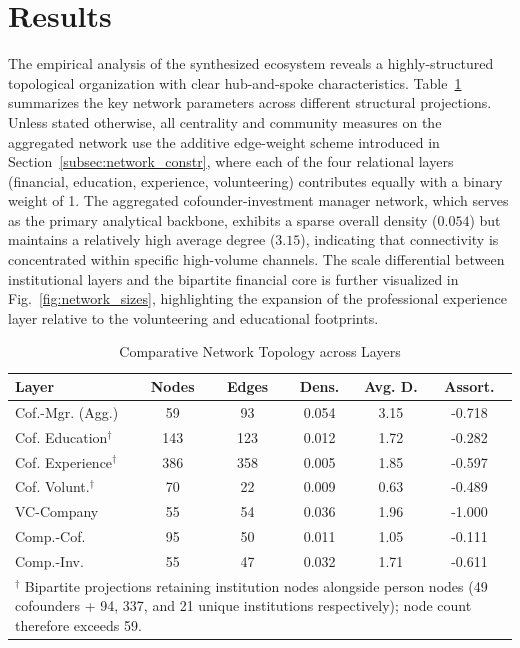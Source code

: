 \documentclass[conference]{IEEEtran}
\begin{document}
\section{Results}

The empirical analysis of the synthesized ecosystem reveals a highly-structured topological organization with clear hub-and-spoke characteristics. Table~\ref{tab:layer_metrics} summarizes the key network parameters across different structural projections. Unless stated otherwise, all centrality and community measures on the aggregated network use the additive edge-weight scheme introduced in Section~\ref{subsec:network_constr}, where each of the four relational layers (financial, education, experience, volunteering) contributes equally with a binary weight of 1. The aggregated cofounder-investment manager network, which serves as the primary analytical backbone, exhibits a sparse overall density ($0.054$) but maintains a relatively high average degree ($3.15$), indicating that connectivity is concentrated within specific high-volume channels. The scale differential between institutional layers and the bipartite financial core is further visualized in Fig.~\ref{fig:network_sizes}, highlighting the expansion of the professional experience layer relative to the volunteering and educational footprints.

\begin{table}[htbp]
\caption{Comparative Network Topology across Layers}
\label{tab:layer_metrics}
\begin{center}
\begin{tabular}{|l|c|c|c|c|c|}
\hline
\textbf{Layer} & \textbf{Nodes} & \textbf{Edges} & \textbf{Dens.} & \textbf{Avg. D.} & \textbf{Assort.} \\
\hline
Cof.-Mgr. (Agg.) & 59 & 93 & 0.054 & 3.15 & -0.718 \\
Cof. Education$^\dagger$ & 143 & 123 & 0.012 & 1.72 & -0.282 \\
Cof. Experience$^\dagger$ & 386 & 358 & 0.005 & 1.85 & -0.597 \\
Cof. Volunt.$^\dagger$ & 70 & 22 & 0.009 & 0.63 & -0.489 \\
VC-Company & 55 & 54 & 0.036 & 1.96 & -1.000 \\
Comp.-Cof. & 95 & 50 & 0.011 & 1.05 & -0.111 \\
Comp.-Inv. & 55 & 47 & 0.032 & 1.71 & -0.611 \\
\hline
\multicolumn{6}{|p{\dimexpr\linewidth-2\tabcolsep-2\arrayrulewidth\relax}|}{%
$^\dagger$ Bipartite projections retaining institution nodes alongside person nodes (49 cofounders + 94, 337, and 21 unique institutions respectively); node count therefore exceeds 59.} \\
\hline
\end{tabular}
\end{center}
\end{table}
\end{document}
